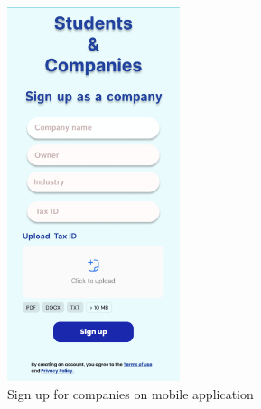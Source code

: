 \begin{figure}[ht]
    \centering
    \includegraphics[width=0.45\textwidth]{RASD-Latex/assets/UI images/signup_company_phone.png}
    \caption{Sign up for companies on mobile application}
    \label{fig:image1}
\end{figure}



